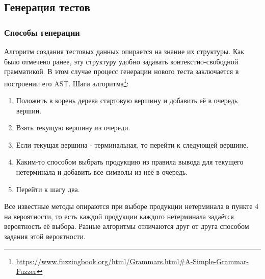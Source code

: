 \documentclass[a4paper]{article}
\begin{document}
\subsection{Генерация тестов}
\indent

\subsubsection{Способы генерации}
\indent

Алгоритм создания тестовых данных опирается на знание их структуры. Как было отмечено ранее, эту структуру удобно задавать контекстно-свободной грамматикой. В этом случае процесс генерации нового теста заключается в построении его AST. Шаги алгоритма\footnote[1]{\href{https://www.fuzzingbook.org/html/Grammars.html\#A-Simple-Grammar-Fuzzer}{https://www.fuzzingbook.org/html/Grammars.html\#A-Simple-Grammar-Fuzzer}}:

\begin{enumerate}
    \item Положить в корень дерева стартовую вершину и добавить её в очередь вершин.
    \item Взять текущую вершину из очереди.
    \item Если текущая вершина - терминальная, то перейти к следующей вершине.
    \item Каким-то способом выбрать продукцию из правила вывода для текущего нетерминала и добавить все символы из неё в очередь.
    \item Перейти к шагу два.
\end{enumerate}

Все известные методы опираются при выборе продукции нетерминала в пункте 4 на вероятности, то есть каждой продукции каждого нетерминала задаётся вероятность её выбора. Разные алгоритмы отличаются друг от друга способом задания этой вероятности. 
\end{document}
